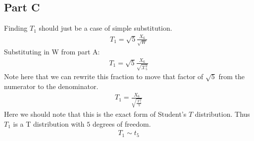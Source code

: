 \documentclass{article}
\begin{document}
\subsection*{Part C}
Finding $T_1$ should just be a case of simple substitution.
\begin{align*}
T_1 = \sqrt{5} \frac{X_6}{\sqrt{W}}
\end{align*}
Substituting in W from part A:
\begin{align*}
T_1 = \sqrt{5} \frac{X_6}{\sqrt{\mathcal{X}_5^2}}
\end{align*}
Note here that we can rewrite this fraction to move that factor of $\sqrt{5}$ from the numerator to the denominator.
\begin{align*}
T_1 = \frac{X_6}{\sqrt{\tfrac{\mathcal{X}_5^2}{5}}} 
\end{align*}
Here we should note that this is the exact form of Student's $T$ distribution. Thus $T_1$ is a T distribution with $5$ degrees of freedom.
\begin{align*}
\boxed{ T_1 \sim t_{5} }
\end{align*}
\end{document}
